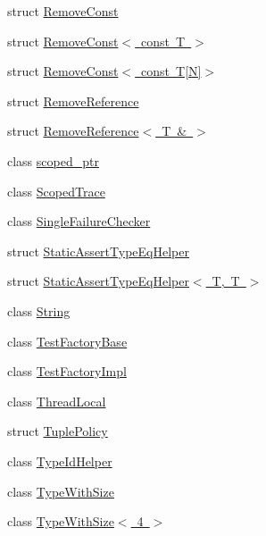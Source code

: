 \begin{DoxyCompactItemize}
struct \mbox{\hyperlink{structtesting_1_1internal_1_1_remove_const}{Remove\+Const}}
\item 
struct \mbox{\hyperlink{structtesting_1_1internal_1_1_remove_const_3_01const_01_t_01_4}{Remove\+Const$<$ const T $>$}}
\item 
struct \mbox{\hyperlink{structtesting_1_1internal_1_1_remove_const_3_01const_01_t[_n]_4}{Remove\+Const$<$ const T\mbox{[}\+N\mbox{]}$>$}}
\item 
struct \mbox{\hyperlink{structtesting_1_1internal_1_1_remove_reference}{Remove\+Reference}}
\item 
struct \mbox{\hyperlink{structtesting_1_1internal_1_1_remove_reference_3_01_t_01_6_01_4}{Remove\+Reference$<$ T \& $>$}}
\item 
class \mbox{\hyperlink{classtesting_1_1internal_1_1scoped__ptr}{scoped\+\_\+ptr}}
\item 
class \mbox{\hyperlink{classtesting_1_1internal_1_1_scoped_trace}{Scoped\+Trace}}
\item 
class \mbox{\hyperlink{classtesting_1_1internal_1_1_single_failure_checker}{Single\+Failure\+Checker}}
\item 
struct \mbox{\hyperlink{structtesting_1_1internal_1_1_static_assert_type_eq_helper}{Static\+Assert\+Type\+Eq\+Helper}}
\item 
struct \mbox{\hyperlink{structtesting_1_1internal_1_1_static_assert_type_eq_helper_3_01_t_00_01_t_01_4}{Static\+Assert\+Type\+Eq\+Helper$<$ T, T $>$}}
\item 
class \mbox{\hyperlink{classtesting_1_1internal_1_1_string}{String}}
\item 
class \mbox{\hyperlink{classtesting_1_1internal_1_1_test_factory_base}{Test\+Factory\+Base}}
\item 
class \mbox{\hyperlink{classtesting_1_1internal_1_1_test_factory_impl}{Test\+Factory\+Impl}}
\item 
class \mbox{\hyperlink{classtesting_1_1internal_1_1_thread_local}{Thread\+Local}}
\item 
struct \mbox{\hyperlink{structtesting_1_1internal_1_1_tuple_policy}{Tuple\+Policy}}
\item 
class \mbox{\hyperlink{classtesting_1_1internal_1_1_type_id_helper}{Type\+Id\+Helper}}
\item 
class \mbox{\hyperlink{classtesting_1_1internal_1_1_type_with_size}{Type\+With\+Size}}
\item 
class \mbox{\hyperlink{classtesting_1_1internal_1_1_type_with_size_3_014_01_4}{Type\+With\+Size$<$ 4 $>$}}
\item 

\end{DoxyCompactItemize}

